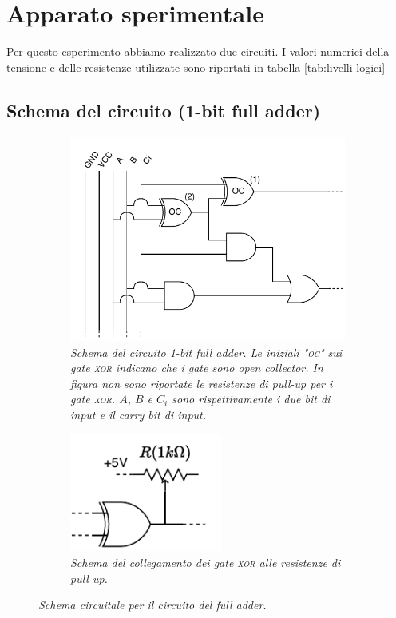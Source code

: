 \section{Apparato sperimentale}\label{sec:apparato-sperimentale}
Per questo esperimento abbiamo realizzato due circuiti.
I valori numerici della tensione e delle resistenze utilizzate sono riportati
in tabella \ref{tab:livelli-logici}

\subsection{Schema del circuito (1-bit full adder)}\label{subsec:schema-circuito}
\begin{figure}[h]
  \begin{subfigure}[t]{.66\textwidth}
    \includegraphics[width=10cm]{../assets/1bfa.drawio.pdf}
    \caption{
      \emph{
        Schema del circuito 1-bit full adder. Le iniziali "\textsc{oc}" sui gate \textsc{xor} indicano che i gate sono
        \emph{open collector}. In figura non sono riportate le resistenze di pull-up per i gate
        \textsc{xor}. $A$, $B$ e $C_i$ sono rispettivamente i due bit di input e il carry bit di input.
      }
    }
    \label{fig:circuito}
  \end{subfigure}
  \hspace{5mm}
  \begin{subfigure}[t]{.25\textwidth}
    \includegraphics[width=5cm]{../assets/oc.drawio.pdf}
    \caption{
      \emph{
        Schema del collegamento dei gate \textsc{xor} alle resistenze di pull-up.
      }
    }
    \label{fig:xor-pullup}
  \end{subfigure}
  \caption{\emph{Schema circuitale per il circuito del full adder.}}
  \label{fig:circuiti}
\end{figure}

